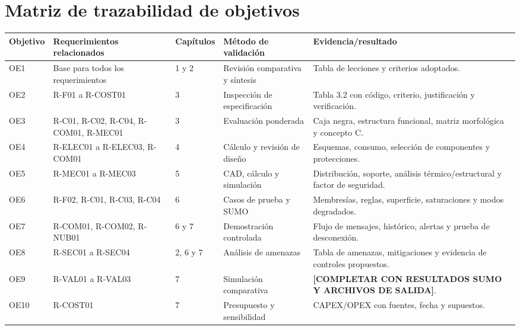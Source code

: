 \documentclass[12pt,a4paper,oneside]{report}
\begin{document}
\section{Matriz de trazabilidad de objetivos}\label{trazabilidad-objetivos-v2}

\begin{landscape}
\footnotesize
{}
\label{tbl:trazabilidad-objetivos-v2}
\begin{longtable}{@{}p{1.4cm}p{4.3cm}p{4.2cm}p{3.7cm}p{7.0cm}@{}}
\toprule
\textbf{Objetivo} & \textbf{Requerimientos relacionados} & \textbf{Capítulos} & \textbf{Método de validación} & \textbf{Evidencia/resultado}\\
\midrule
\endhead
OE1 & Base para todos los requerimientos & 1 y 2 & Revisión comparativa y síntesis & Tabla de lecciones y criterios adoptados.\\
OE2 & R-F01 a R-COST01 & 3 & Inspección de especificación & Tabla 3.2 con código, criterio, justificación y verificación.\\
OE3 & R-C01, R-C02, R-C04, R-COM01, R-MEC01 & 3 & Evaluación ponderada & Caja negra, estructura funcional, matriz morfológica y concepto C.\\
OE4 & R-ELEC01 a R-ELEC03, R-COM01 & 4 & Cálculo y revisión de diseño & Esquemas, consumo, selección de componentes y protecciones.\\
OE5 & R-MEC01 a R-MEC03 & 5 & CAD, cálculo y simulación & Distribución, soporte, análisis térmico/estructural y factor de seguridad.\\
OE6 & R-F02, R-C01, R-C03, R-C04 & 6 & Casos de prueba y SUMO & Membresías, reglas, superficie, saturaciones y modos degradados.\\
OE7 & R-COM01, R-COM02, R-NUB01 & 6 y 7 & Demostración controlada & Flujo de mensajes, histórico, alertas y prueba de desconexión.\\
OE8 & R-SEC01 a R-SEC04 & 2, 6 y 7 & Análisis de amenazas & Tabla de amenazas, mitigaciones y evidencia de controles propuestos.\\
OE9 & R-VAL01 a R-VAL03 & 7 & Simulación comparativa & \textbf{[COMPLETAR CON RESULTADOS SUMO Y ARCHIVOS DE SALIDA]}.\\
OE10 & R-COST01 & 7 & Presupuesto y sensibilidad & CAPEX/OPEX con fuentes, fecha y supuestos.\\
\bottomrule
\end{longtable}
\end{landscape}
\end{document}
